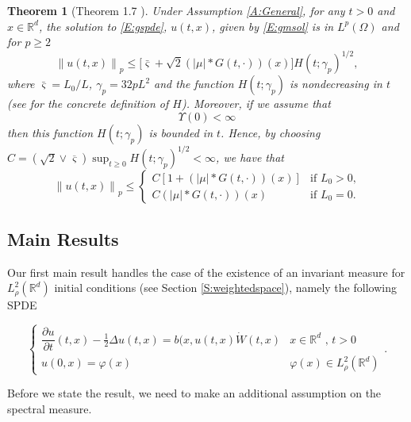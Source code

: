 \documentclass[a4paper,11pt]{article}%
\numberwithin{equation}{section}
\theoremstyle{plain}
\newtheorem{theorem}{Theorem}[section]
\theoremstyle{definition}
\newcommand{\R}{\mathbb{R}}
\newcommand{\Norm}[1]{\left\|  #1   \right\|}
\begin{document}
\begin{theorem}[Theorem 1.7 \cite{CH19}]
	\label{T:ExUn}
	Under Assumption \ref{A:General}, for any $t>0$ and $x \in \R^d$, the solution to \eqref{E:gspde}, $u(t,x)$,
	given by \eqref{E:gmsol} is in $L^p(\Omega)$ and for $p\ge 2$
	\begin{equation}
	\label{E:mb}
	\Norm{u(t,x)}_p \le \big[\bar{\varsigma}+\sqrt{2}(|\mu|*G(t,\cdot))(x)\big]H(t;\gamma_p)^{1/2},
	\end{equation}
	where $\bar{\varsigma}=L_0/L$, $\gamma_p = 32pL^2$ and the function $H(t;\gamma_p)$ is nondecreasing in $t$ (see \cite{CH19} for
	the concrete definition of $H$).
	Moreover, if we assume that
	\begin{equation}
	\Upsilon(0) < \infty \label{A:dalcon0}
	\end{equation}
	then this function $H(t;\gamma_p)$ is bounded in $t$. Hence, by choosing
	$C=\left(\sqrt{2}\vee \overline{\varsigma}\right)\sup_{t\ge 0} H(t;\gamma_p)^{1/2}<\infty$,
	we have that
	\begin{equation}
	\label{E:mb0}
	\Norm{u(t,x)}_p \le
	\begin{cases}
	C\left[1+\left(|\mu|*G(t,\cdot)\right)(x)\right] & \text{if $L_0> 0$,}\\
	C\left(|\mu|*G(t,\cdot)\right)(x) & \text{if $L_0= 0$}.
	\end{cases}
	\end{equation}
\end{theorem}

\subsection{Main Results}

Our first main result handles the case of the existence of an invariant measure for $L^2_{\rho}(\R^d)$ initial conditions (see Section \ref{S:weightedspace}), namely the following SPDE

\begin{equation}
	\label{E:spde}
	\begin{cases}
		\dfrac{\partial u}{\partial t}(t,x)-\frac{1}{2}\Delta u(t,x) = b(x,u(t,x)\dot W(t,x) & \text{$x\in \R^d$ , $t>0$} \\
		u(0,x)=\varphi(x)                                                                      & \varphi(x) \in L^2_\rho(\R^d)
	\end{cases}.
\end{equation}

Before we state the result, we need to make an additional assumption on the spectral measure.
\end{document}
